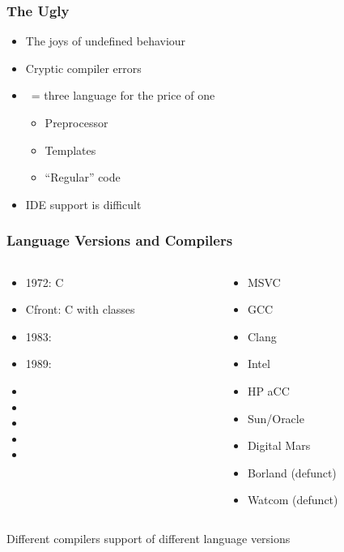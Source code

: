 \documentclass{../ucll-slides}
\begin{document}
\begin{frame}
  \frametitle{The Ugly}
  \begin{itemize}
    \item The joys of undefined behaviour
    \item Cryptic compiler errors
    \item \cpp\ = three language for the price of one
          \begin{itemize}
            \item Preprocessor
            \item Templates
            \item ``Regular'' code
          \end{itemize}
    \item IDE support is difficult
  \end{itemize}
\end{frame}


\begin{frame}
  \frametitle{Language Versions and Compilers}
  \begin{columns}
    \begin{column}{5cm}
      \begin{itemize}
        \item 1972: C
        \item Cfront: C with classes
        \item 1983: \cpp
        \item 1989: 
        \item {}
        \item {}
        \item {}
        \item {}
        \item {}
      \end{itemize}
    \end{column}
    \begin{column}{5cm}
      \begin{itemize}
        \item MSVC
        \item GCC
        \item Clang
        \item Intel \cpp
        \item HP aCC
        \item Sun/Oracle \cpp
        \item Digital Mars \cpp
        \item Borland (defunct)
        \item Watcom (defunct)
      \end{itemize}
    \end{column}
  \end{columns}
  \begin{center}
    Different compilers support 
    of different language versions
  \end{center}
\end{frame}
\end{document}
